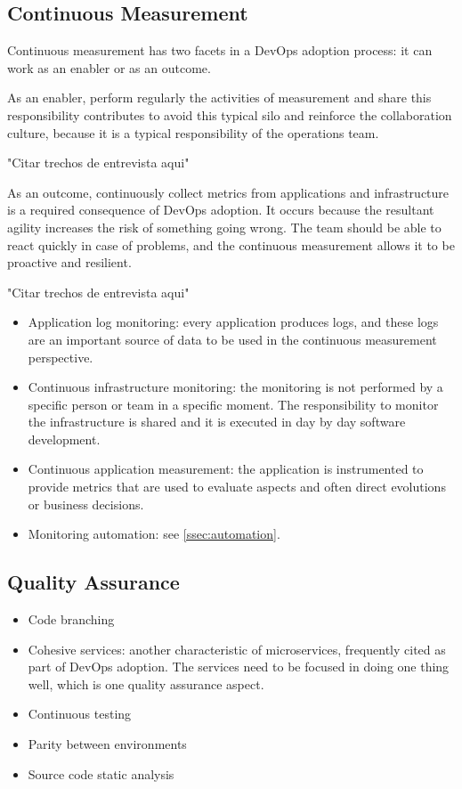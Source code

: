 \subsection{Continuous Measurement}
Continuous measurement has two facets in a DevOps adoption process: it can work as an enabler or as an outcome.

As an enabler, perform regularly the activities of measurement and share this responsibility contributes to avoid this typical silo and reinforce the collaboration culture, because it is a typical responsibility of the operations team.

"Citar trechos de entrevista aqui"

As an outcome, continuously collect metrics from applications and infrastructure is a required consequence of DevOps adoption. It occurs because the resultant agility increases the risk of something going wrong. The team should be able to react quickly in case of problems, and the continuous measurement allows it to be proactive and resilient.

"Citar trechos de entrevista aqui"

\begin{itemize}
\item Application log monitoring: every application produces logs, and these logs are an important source of data to be used in the continuous measurement perspective.

\item Continuous infrastructure monitoring: the monitoring is not performed by a specific person or team in a specific moment. The responsibility to monitor the infrastructure is shared and it is executed in day by day software development.

\item Continuous application measurement: the application is instrumented to provide metrics that are used to evaluate aspects and often direct evolutions or business decisions.

\item Monitoring automation: see \ref{ssec:automation}.
\end{itemize}

\subsection{Quality Assurance}
\begin{itemize}
\item Code branching

\item Cohesive services: another characteristic of microservices, frequently cited as part of DevOps adoption. The services need to be focused in doing one thing well, which is one quality assurance aspect.

\item Continuous testing
\item Parity between environments
\item Source code static analysis
\end{itemize}

